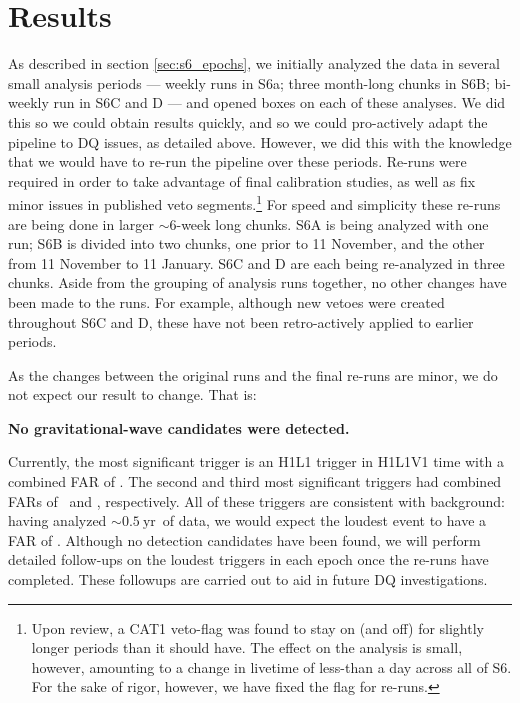 \section{Results}

As described in section \ref{sec:s6_epochs}, we initially analyzed the data in several small analysis periods --- weekly runs in S6a; three month-long chunks in S6B; bi-weekly run in S6C and D --- and opened boxes on each of these analyses. We did this so we could obtain results quickly, and so we could pro-actively adapt the pipeline to \ac{DQ} issues, as detailed above. However, we did this with the knowledge that we would have to re-run the pipeline over these periods. Re-runs were required in order to take advantage of final calibration studies, as well as fix minor issues in published veto segments.\footnote{Upon review, a CAT1 veto-flag was found to stay on (and off) for slightly longer periods than it should have. The effect on the analysis is small, however, amounting to a change in livetime of less-than a day across all of S6. For the sake of rigor, however, we have fixed the flag for re-runs.} For speed and simplicity these re-runs are being done in larger $\sim6$-week long chunks. S6A is being analyzed with one run; S6B is divided into two chunks, one prior to 11 November, and the other from 11 November to 11 January. S6C and D are each being re-analyzed in three chunks. Aside from the grouping of analysis runs together, no other changes have been made to the runs. For example, although new vetoes were created throughout S6C and D, these have not been retro-actively applied to earlier periods.

As the changes between the original runs and the final re-runs are minor, we do not expect our result to change. That is:
\begin{center}
\textbf{No gravitational-wave candidates were detected.}
\end{center}
Currently, the most significant trigger is an H1L1 trigger in H1L1V1 time with a
combined FAR of \firstFAR. The second and third most significant triggers had
combined FARs of \secondFAR~and \thirdFAR, respectively. All of these triggers
are consistent with background: having analyzed
$\mathrm{\sim0.5~yr}$~of data, we would expect the loudest event to
have a FAR of \expectedLoudestFAR. Although no detection candidates have been found,
 we will perform detailed follow-ups on the loudest triggers in each epoch once the re-runs have completed. These followups are carried out to aid in future \ac{DQ} investigations.

